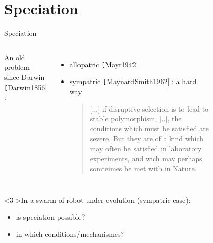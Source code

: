 \documentclass[8pt, handout=show,notes=show]{beamer}
\begin{document}

\section{Speciation}


\begin{frame}{Speciation}
\begin{columns}

An old problem since Darwin {\scriptsize \texttt [Darwin1856]} :
\begin{itemize}
	\item allopatric {\scriptsize \texttt [Mayr1942]}
	\item sympatric  {\scriptsize \texttt [MaynardSmith1962] } : a hard way 
	\begin{quotation}
		\small
		[...] if disruptive selection is to lead to stable polymorphism, [..], the conditions which must be satisfied are severe. But they are of a kind which may often be satisfied in laboratory experiments, and wich may perhaps somteimes be met with in Nature.
	\end{quotation}

\end{itemize}


\begin{figure}
		\label{figa:specAl} 
	\hspace{.2cm}
		\label{figa:specSy} 
\end{figure}
\end{columns}



\begin{alertblock}<3->{In a swarm of robot under evolution (sympatric case):}
\begin{itemize}
\item is speciation possible?
\item in which conditions/mechanismes?
\end{itemize}
\end{alertblock}


\end{frame}
\end{document}
